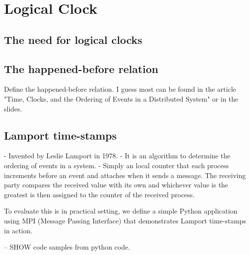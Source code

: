 \section{Logical Clock}\label{sc:logicalClock}

\subsection{The need for logical clocks}

\subsection{The happened-before relation}

Define the happened-before relation. I guess most can be found in the article "Time, Clocks, and the Ordering of Events in a Distributed System" or in the slides.

\subsection{Lamport time-stamps}

- Invented by Leslie Lamport in 1978.
- It is an algorithm to determine the ordering of events in a system.
- Simply an local counter that each process increments before an event and attaches when it sends a message. The receiving party compares the received value with its own and whichever value is the greatest is then assigned to the counter of the received process.

To evaluate this is in practical setting, we define a simple Python application using MPI (Message Passing Interface) that demonstrates Lamport time-stamps in action.

-- SHOW code samples from python code.

